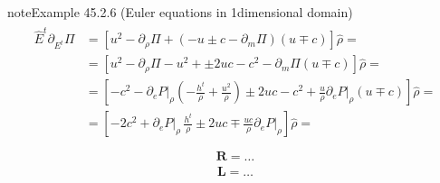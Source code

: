 \documentclass[letterpaper,10pt,english]{jupyterBook}
\begin{document}
\begin{sphinxadmonition}{note}{Example 45.2.6 (Euler equations in 1\sphinxhyphen{}dimensional domain)}
\begin{equation*}
\begin{split}\begin{aligned}
  \hat{E}^t \partial_{E^t} \Pi
  & = \left[  u^2 - \partial_\rho \Pi + ( -u \pm c -\partial_m \Pi ) (u \mp c) \right] \hat{\rho} = \\
  & = \left[  u^2 - \partial_\rho \Pi - u^2 + \pm 2 u c - c^2  -\partial_m \Pi (u \mp c) \right] \hat{\rho} = \\
  & = \left[ - c^2 - \partial_e P \big|_\rho \left( - \frac{h^t}{\rho} + \frac{u^2}{\rho} \right) \pm 2 u c - c^2  + \frac{u}{\rho} \partial_e P \big|_\rho (u \mp c) \right] \hat{\rho} = \\
  & = \left[ - 2 c^2 + \partial_e P \big|_\rho \, \frac{h^t}{\rho} \pm 2 u c  \mp  \frac{u c}{\rho} \partial_e P\big|_\rho \right] \hat{\rho} = \\
\end{aligned}\end{split}
\end{equation*}\begin{equation*}
\begin{split}\mathbf{R} = \dots \end{split}
\end{equation*}\begin{equation*}
\begin{split}\mathbf{L} = \dots \end{split}
\end{equation*}\end{sphinxadmonition}
\label{ch/pde/hyperbolic-dimensions:example-6}
\end{document}
